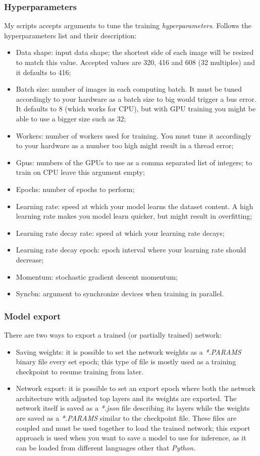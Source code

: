 \subsubsection{Hyperparameters}
My scripts accepts arguments to tune the training \emph{hyperparameters}. Follows the hyperparameters list and their description:
\begin{itemize}
	\item Data shape: input data shape; the shortest side of each image will be resized to match this value. Accepted values are 320, 416 and 608 (32 multiples) and it defaults to 416;
	\item Batch size: number of images in each computing batch. It must be tuned accordingly to your hardware as a batch size to big would trigger a bus error. It defaults to 8 (which works for CPU), but with GPU training you might be able to use a bigger size such as 32;
	\item Workers: number of workers used for training. You must tune it accordingly to your hardware as a number too high might result in a thread error;
	\item Gpus: numbers of the GPUs to use as a comma separated list of integers; to train on CPU leave this argument empty;
	\item Epochs: number of epochs to perform;
	\item Learning rate: speed at which your model learns the dataset content. A high learning rate makes you model learn quicker, but might result in overfitting;
	\item Learning rate decay rate: speed at which your learning rate decays;
	\item Learning rate decay epoch: epoch interval where your learning rate should decrease;
	\item Momentum: stochastic gradient descent momentum;
	\item Syncbn: argument to synchronize devices when training in parallel.
\end{itemize}


\subsubsection{Model export}
There are two ways to export a trained (or partially trained) network:
\begin{itemize}
	\item Saving weights: it is possible to set the network weights as a \emph{*.PARAMS} binary file every set epoch; this type of file is mostly used as a training checkpoint to resume training from later.
	\item Network export: it is possible to set an export epoch where both the network architecture with adjusted top layers and its weights are exported. The network itself is saved as a \emph{*.json} file describing its layers while the weights are saved as a \emph{*.PARAMS} similar to the checkpoint file. These files are coupled and must be used together to load the trained network; this export approach is used when you want to save a model to use for inference, as it can be loaded from different languages other that \emph{Python}.
\end{itemize}

